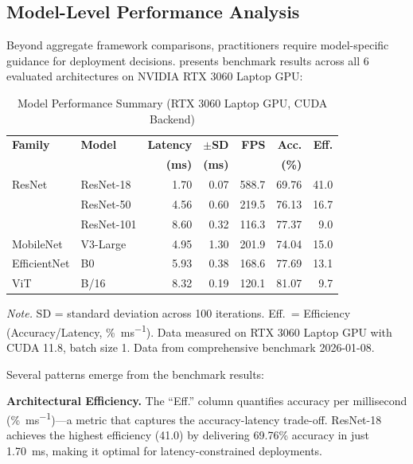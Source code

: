 \documentclass[10pt,twocolumn,a4paper]{article}
\theoremstyle{definition}
\theoremstyle{plain}
\begin{document}
\subsection{Model-Level Performance Analysis}

Beyond aggregate framework comparisons, practitioners require model-specific guidance for deployment decisions.  presents benchmark results across all 6 evaluated architectures on NVIDIA RTX 3060 Laptop GPU:

\begin{table}[t]
\centering
\caption{Model Performance Summary (RTX 3060 Laptop GPU, CUDA Backend)}
\label{tab:sota}
\scriptsize
\setlength{\tabcolsep}{2pt}
\begin{tabular}{@{}llrrrrr@{}}
\toprule
\textbf{Family} & \textbf{Model} & \textbf{Latency} & \textbf{$\pm$SD} & \textbf{FPS} & \textbf{Acc.} & \textbf{Eff.} \\
 & & \textbf{(ms)} & \textbf{(ms)} & & \textbf{(\%)} & \\
\midrule
ResNet & ResNet-18 & 1.70 & 0.07 & 588.7 & 69.76 & 41.0 \\
 & ResNet-50 & 4.56 & 0.60 & 219.5 & 76.13 & 16.7 \\
 & ResNet-101 & 8.60 & 0.32 & 116.3 & 77.37 & 9.0 \\
\midrule
MobileNet & V3-Large & 4.95 & 1.30 & 201.9 & 74.04 & 15.0 \\
\midrule
EfficientNet & B0 & 5.93 & 0.38 & 168.6 & 77.69 & 13.1 \\
\midrule
ViT & B/16 & 8.32 & 0.19 & 120.1 & 81.07 & 9.7 \\
\bottomrule
\end{tabular}

\vspace{0.3em}
\noindent\scriptsize\textit{Note.} SD = standard deviation across 100 iterations. Eff.\ = Efficiency (Accuracy/Latency, \si{\percent\per\milli\second}). Data measured on RTX 3060 Laptop GPU with CUDA 11.8, batch size 1. Data from comprehensive benchmark 2026-01-08.
\end{table}

Several patterns emerge from the benchmark results:

\textbf{Architectural Efficiency.} The ``Eff.'' column quantifies accuracy per millisecond (\si{\percent\per\milli\second})---a metric that captures the accuracy-latency trade-off. ResNet-18 achieves the highest efficiency (41.0) by delivering 69.76\% accuracy in just \SI{1.70}{\milli\second}, making it optimal for latency-constrained deployments.
\end{document}
